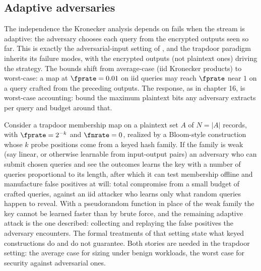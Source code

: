 \subsection*{Adaptive adversaries}

The independence the Kronecker analysis depends on fails when the stream
is adaptive: the adversary chooses each query from the encrypted outputs
seen so far. This is exactly the adversarial-input setting of
, and the trapdoor paradigm inherits its
failure modes, with the encrypted outputs (not plaintext ones) driving
the strategy. The bounds shift from average-case (iid Kronecker products)
to worst-case: a map at $\fprate = 0.01$ on iid queries may reach
$\fprate$ near $1$ on a query crafted from the preceding outputs. The
response, as in chapter 16, is worst-case accounting: bound the maximum
plaintext bits any adversary extracts per query and budget around that.

Consider a trapdoor membership map on a plaintext set $A$ of $N = |A|$
records, with $\fprate = 2^{-k}$ and $\fnrate = 0$, realized by a
Bloom-style construction whose $k$ probe positions come from a keyed hash
family. If the family is weak (say linear, or otherwise learnable from
input-output pairs) an adversary who can submit chosen queries and see
the outcomes learns the key with a number of queries proportional to its
length, after which it can test membership offline and manufacture false
positives at will: total compromise from a small budget of crafted
queries, against an iid attacker who learns only what random queries
happen to reveal. With a pseudorandom function in place of the weak family
the key cannot be learned faster than by brute force, and the remaining
adaptive attack is the one  described:
collecting and replaying the false positives the adversary encounters.
The formal treatments of that setting
\parencite{naor-yogev-2015,clayton-patton-shrimpton-2019,filic-et-al-2022}
state what keyed constructions do and do not guarantee. Both stories are
needed in the trapdoor setting: the average case for sizing under benign
workloads, the worst case for security against adversarial ones.
